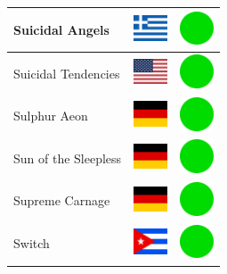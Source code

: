 \documentclass[12pt, a4paper, twoside]{report}
\begin{document}
\begin{center}
\begin{longtable}{|p{5cm}|p{2cm}|p{2cm}|}
Suicidal Angels & \includegraphics[width=1cm]{4x3/gr} & \includegraphics[width=1cm]{likes/y} \\ \hline
Suicidal Tendencies & \includegraphics[width=1cm]{4x3/us} & \includegraphics[width=1cm]{likes/y} \\ \hline
Sulphur Aeon & \includegraphics[width=1cm]{4x3/de} & \includegraphics[width=1cm]{likes/y} \\ \hline
Sun of the Sleepless & \includegraphics[width=1cm]{4x3/de} & \includegraphics[width=1cm]{likes/y} \\ \hline
Supreme Carnage & \includegraphics[width=1cm]{4x3/de} & \includegraphics[width=1cm]{likes/y} \\ \hline
Switch & \includegraphics[width=1cm]{4x3/cu} & \includegraphics[width=1cm]{likes/y} \\ \hline

\end{longtable}
\end{center}
\end{document}
